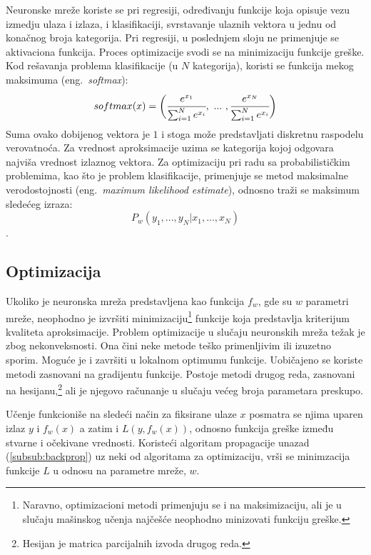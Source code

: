 Neuronske mreže koriste se pri regresiji, određivanju funkcije koja opisuje vezu izmedju ulaza i izlaza, i klasifikaciji, svrstavanje ulaznih vektora u jednu od konačnog broja kategorija. Pri regresiji, u poslednjem sloju ne primenjuje se aktivaciona funkcija. Proces optimizacije svodi se na minimizaciju funkcije greške. Kod rešavanja problema klasifikacije (u $N$ kategorija), koristi se funkcija mekog maksimuma (eng.~{\em softmax}):
\begin{equation}
	softmax(x) = \bigg( \cfrac{e^{x_1}}{\sum_{i=1}^{N} e^{x_i}}, ~...~, \cfrac{e^{x_N}}{\sum_{i=1}^{N} e^{x_i}} \bigg)
\end{equation}
Suma ovako dobijenog vektora je $1$ i stoga može predstavljati diskretnu raspodelu verovatnoća. Za vrednost aproksimacije uzima se kategorija kojoj odgovara najviša vrednost izlaznog vektora. Za optimizaciju pri radu sa probabilističkim problemima, kao što je problem klasifikacije, primenjuje se metod maksimalne verodostojnosti (eng.~{\em maximum likelihood estimate}), odnosno traži se maksimum sledećeg izraza: 
\begin{equation}
	P_w(y_1, ..., y_N | x_1, ..., x_N)
\end{equation}.

\subsection{Optimizacija}
\label{subsec:optimizacija}

Ukoliko je neuronska mreža predstavljena kao funkcija $f_w$, gde su $w$ parametri mreže, neophodno je izvršiti minimizaciju\footnote{Naravno, optimizacioni metodi primenjuju se i na maksimizaciju, ali je u slučaju mašinskog učenja najčešće neophodno minizovati funkciju greške.} funkcije koja predstavlja kriterijum kvaliteta aproksimacije. Problem optimizacije u slučaju neuronskih mreža težak je zbog nekonveksnosti. Ona čini neke metode teško primenljivim ili izuzetno sporim. Moguće je i završiti u lokalnom optimumu funkcije. Uobičajeno se koriste metodi zasnovani na gradijentu funkcije. Postoje metodi drugog reda, zasnovani na hesijanu,\footnote{Hesijan je matrica parcijalnih izvoda drugog reda.} ali je njegovo računanje u slučaju većeg broja parametara preskupo. \par
Učenje funkcioniše na sledeći način za fiksirane ulaze $x$ posmatra se njima uparen izlaz $y$ i $f_w(x)$ a zatim i $L(y, f_w(x))$, odnosno funkcija greške između stvarne i očekivane vrednosti. Koristeći algoritam propagacije unazad (\ref{subsub:backprop}) uz neki od algoritama za optimizaciju, vrši se minimzacija funkcije $L$ u odnosu na parametre mreže, $w$. 

